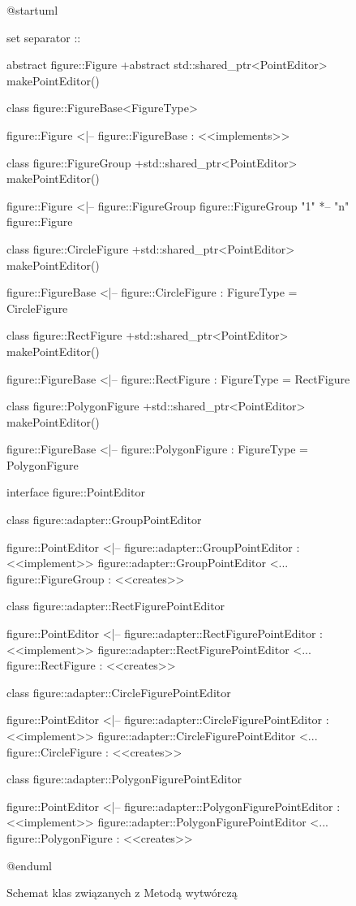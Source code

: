 \documentclass[a4paper,12pt]{article}
\begin{document}
\begin{figure}[H]

\begin{plantuml}
@startuml

set separator ::

abstract figure::Figure {
  +{abstract} std::shared_ptr<PointEditor> makePointEditor()
}

class figure::FigureBase<FigureType> {
}

figure::Figure <|-- figure::FigureBase : <<implements>>

class figure::FigureGroup {
  +std::shared_ptr<PointEditor> makePointEditor()
}

figure::Figure <|-- figure::FigureGroup
figure::FigureGroup "1" *-- "n" figure::Figure

class figure::CircleFigure {
  +std::shared_ptr<PointEditor> makePointEditor()
}

figure::FigureBase <|-- figure::CircleFigure : FigureType = CircleFigure

class figure::RectFigure {
  +std::shared_ptr<PointEditor> makePointEditor()
}

figure::FigureBase <|-- figure::RectFigure : FigureType = RectFigure

class figure::PolygonFigure {
  +std::shared_ptr<PointEditor> makePointEditor()
}

figure::FigureBase <|-- figure::PolygonFigure : FigureType = PolygonFigure


interface figure::PointEditor {
}

class figure::adapter::GroupPointEditor {
}

figure::PointEditor <|-- figure::adapter::GroupPointEditor : <<implement>>
figure::adapter::GroupPointEditor <... figure::FigureGroup : <<creates>>

class figure::adapter::RectFigurePointEditor {
}

figure::PointEditor <|-- figure::adapter::RectFigurePointEditor : <<implement>>
figure::adapter::RectFigurePointEditor <... figure::RectFigure : <<creates>>

class figure::adapter::CircleFigurePointEditor {
}

figure::PointEditor <|-- figure::adapter::CircleFigurePointEditor : <<implement>>
figure::adapter::CircleFigurePointEditor <... figure::CircleFigure : <<creates>>

class figure::adapter::PolygonFigurePointEditor {
}

figure::PointEditor <|-- figure::adapter::PolygonFigurePointEditor : <<implement>>
figure::adapter::PolygonFigurePointEditor <... figure::PolygonFigure : <<creates>>

@enduml
\end{plantuml}

\caption{Schemat klas związanych z Metodą wytwórczą}

\end{figure}
\end{document}
